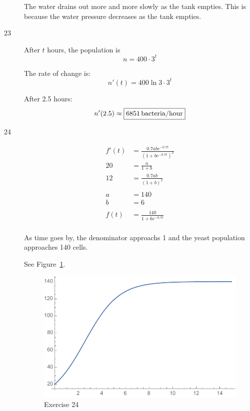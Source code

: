 \documentclass[letterpaper, landscape]{exam}
\begin{document}
\begin{description}
      The water drains out more and more slowly as the tank empties. This is because
      the water pressure decreases as the tank empties.

    \item[23]
      After $t$ hours, the population is 
      \[
        n = 400 \cdot 3^t 
      \]

      The rate of change is:
      \[
        n'(t) = 400 \ln 3 \cdot 3^t
      \]

      After 2.5 hours:
      \[
        n'(2.5) \approx \boxed{ \unit[6851]{bacteria/hour} }
      \]

    \item[24]
      \begin{align*}
        f'(t) &= \frac{0.7abe^{ - 0.7 t}}{\left( 1 + be^{ - 0.7 t} \right)^2}
        \\
        20 &= \frac{a}{1 + b} \\
        12 &= \frac{0.7 ab}{\left( 1 + b \right)^2} \\
        \\
        a &= 140 \\
        b &= 6 \\
        \\
        f(t) &= \frac{140}{1 + 6 e^{-0.7t}} \\
      \end{align*}

      As time goes by, the denominator approachs 1 and the yeast population approaches 140 cells. 
      
      See Figure~\ref{fig:ex24}.

      \begin{figure}[H]
        \centering
        \includegraphics[scale = 0.5]{ex24}
        \caption{Exercise 24}
        \label{fig:ex24}
      \end{figure}



\end{description}
\end{document}
